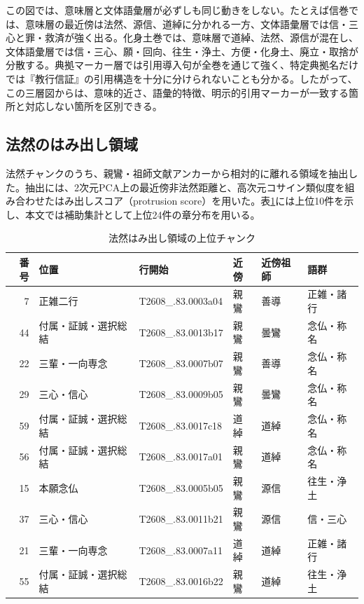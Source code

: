 \documentclass[uplatex,dvipdfmx,11pt,a4paper]{jsarticle}
\begin{document}
この図では、意味層と文体語彙層が必ずしも同じ動きをしない。たとえば信巻では、意味層の最近傍は法然、源信、道綽に分かれる一方、文体語彙層では信・三心と罪・救済が強く出る。化身土巻では、意味層で道綽、法然、源信が混在し、文体語彙層では信・三心、願・回向、往生・浄土、方便・化身土、廃立・取捨が分散する。典拠マーカー層では引用導入句が全巻を通じて強く、特定典拠名だけでは『教行信証』の引用構造を十分に分けられないことも分かる。したがって、この三層図からは、意味的近さ、語彙的特徴、明示的引用マーカーが一致する箇所と対応しない箇所を区別できる。

\subsection{法然のはみ出し領域}

法然チャンクのうち、親鸞・祖師文献アンカーから相対的に離れる領域を抽出した。抽出には、2次元PCA上の最近傍非法然距離と、高次元コサイン類似度を組み合わせたはみ出しスコア（protrusion score）を用いた。表\ref{tab:honen-protrusion}には上位10件を示し、本文では補助集計として上位24件の章分布を用いる。

\begin{table}[H]
\centering
\small
\caption{法然はみ出し領域の上位チャンク}
\label{tab:honen-protrusion}
\begin{tabular}{@{}rlllll@{}}
\toprule
番号 & 位置 & 行開始 & 近傍 & 近傍祖師 & 語群 \\
\midrule
7 & 正雑二行 & T2608\_.83.0003a04 & 親鸞 & 善導 & 正雑・諸行 \\
44 & 付属・証誠・選択総結 & T2608\_.83.0013b17 & 親鸞 & 曇鸞 & 念仏・称名 \\
22 & 三輩・一向専念 & T2608\_.83.0007b07 & 親鸞 & 善導 & 念仏・称名 \\
29 & 三心・信心 & T2608\_.83.0009b05 & 親鸞 & 曇鸞 & 念仏・称名 \\
59 & 付属・証誠・選択総結 & T2608\_.83.0017c18 & 道綽 & 道綽 & 念仏・称名 \\
56 & 付属・証誠・選択総結 & T2608\_.83.0017a01 & 親鸞 & 道綽 & 念仏・称名 \\
15 & 本願念仏 & T2608\_.83.0005b05 & 親鸞 & 源信 & 往生・浄土 \\
37 & 三心・信心 & T2608\_.83.0011b21 & 親鸞 & 源信 & 信・三心 \\
21 & 三輩・一向専念 & T2608\_.83.0007a11 & 道綽 & 道綽 & 正雑・諸行 \\
55 & 付属・証誠・選択総結 & T2608\_.83.0016b22 & 親鸞 & 道綽 & 往生・浄土 \\
\bottomrule
\end{tabular}
\end{table}
\end{document}

